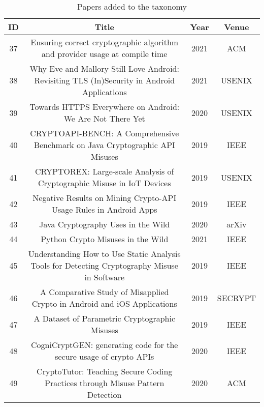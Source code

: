 \begin{table*}
    
    \centering
    \tiny
    \caption{\small Papers added to the taxonomy}
    \label{table:new_papers}
    \begin{tabular}{ |c|c|c|c| } 
     \hline
    ID & Title & Year & Venue \\
    \hline
    37 & Ensuring correct cryptographic algorithm and provider usage at compile time \cite{Xing_Cheng_Dietl_2021} & 2021 & ACM \\
    \hline
    38 & Why Eve and Mallory Still Love Android: Revisiting TLS (In)Security in Android Applications \cite{oha+21} & 2021 & USENIX \\
    \hline
    39 & Towards HTTPS Everywhere on Android: We Are Not There Yet \cite{Possemato_Fratantonio} & 2020 & USENIX \\
    \hline
    40 & CRYPTOAPI-BENCH: A Comprehensive Benchmark on Java Cryptographic API Misuses \cite{Afrose_Rahaman_Yao_2019} & 2019 & IEEE \\
    \hline
    41 & CRYPTOREX: Large-scale Analysis of Cryptographic Misuse in IoT Devices \cite{ZCD+19} & 2019 & USENIX \\
    \hline
    42 & Negative Results on Mining Crypto-API Usage Rules in Android Apps \cite{GKL+19} & 2019 & IEEE \\
    \hline
    43 & Java Cryptography Uses in the Wild \cite{Hazhirpasand_Ghafari_Nierstrasz_2020} & 2020 & arXiv \\
    \hline
    44 & Python Crypto Misuses in the Wild \cite{Wickert_Baumgärtner_Breitfelder_Mezini_2021} & 2021 & IEEE \\
    \hline
    45 & Understanding How to Use Static Analysis Tools for Detecting Cryptography Misuse in Software \cite{BDA+19} & 2019 & IEEE \\
    \hline
    46 & A Comparative Study of Misapplied Crypto in Android and iOS Applications \cite{Feichtner_2019} & 2019 & SECRYPT \\
    \hline
    47 & A Dataset of Parametric Cryptographic Misuses \cite{Wickert_Reif_Eichberg_Dodhy_Mezini_2019} & 2019 & IEEE \\
    \hline
    48 & CogniCryptGEN: generating code for the secure usage of crypto APIs \cite{Krüger_Ali_Bodden_2020} & 2020 & IEEE \\
    \hline
    49 & CryptoTutor: Teaching Secure Coding Practices through Misuse Pattern Detection \cite{Singleton_Zhao_Song_Siy_2020} & 2020 & ACM \\

\end{tabular}
\end{table*}
